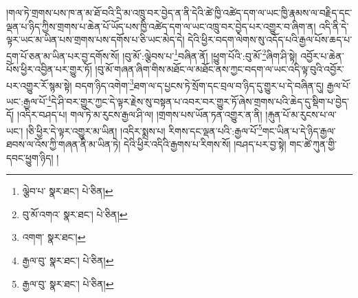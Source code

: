 །གལ་ཏེ་གྲགས་པས་ཁ་ན་མ་ཐོ་བའི་དྲི་མ་འཁྲུ་བར་བྱེད་ན་ནི་དེའི་ཚེ་ཁྱི་འཚེད་དག་ལ་ཡང་ཁྱི་རྣམས་ལ་བརྗིད་དང་ལྡན་པ་ཉིད་ཀྱིས་གྲགས་པ་ཆེན་པོ་ཡོད་པས་ཁྱི་འཚེད་དག་ལ་ཡང་འཁྲུ་བར་བྱེད་པར་འགྱུར་བ་ཞིག་ན། འདི་ནི་དེ་ལྟར་ཡང་མ་ཡིན་པས་གྲགས་པས་དགོས་པ་ཅི་ཡང་མེད་དེ། དེའི་ཕྱིར་བདག་ལེགས་སུ་འདོད་པའི་རྒྱལ་པོས་ཆད་པ་དྲག་པོ་ཅན་མ་ཡིན་པར་བྱ་དགོས་སོ། །བུ་མོ་:ལྕེབས་པ་\footnote{ལྕེབ་པ་  སྣར་ཐང་།  པེ་ཅིན། }བཞིན་ནོ། །ཕྱུག་པོའི་:བུ་མོ་\footnote{བུ་མོ་འགའ་  སྣར་ཐང་།  པེ་ཅིན། }ཞིག་ཤི་སྟེ། འབྱོར་པ་ཆེན་པོས་ཕྱིར་འབྱིན་པར་གྱུར་ཏོ། །བུ་མོ་གཞན་ཞིག་གིས་མཐོང་ལ་མཐོང་ནས་ཀྱང་བདག་ལ་ཡང་འདི་ལྟ་བུའི་འབྱོར་པར་འགྱུར་རོ་སྙམ་སྟེ། བདག་ཉིད་འགེག་\footnote{འགག་  སྣར་ཐང་། }ཐག་ལ་ད་པྱངས་ཏེ་སྲོག་དང་བྲལ་བ་ཉིད་དུ་གྱུར་པ་དེ་བཞིན་དུ། རྒྱལ་པོ་ཡང་:རྒྱལ་པོ་\footnote{རྒྱལ་བུ་  སྣར་ཐང་།  པེ་ཅིན། }དེ་ཤི་བར་གྱུར་ཀྱང་དེ་ལྟར་རྗེས་སུ་བསྟན་པ་འབར་བར་གྱུར་ཏོ་ཞེས་གྲགས་པའི་ཆེད་དུ་སྡིག་པ་བྱེད་དོ། །འདིར་བཤད་པ། གལ་ཏེ་མ་རུངས་རྒྱལ་ཤི་ལ། །གྲགས་པས་ཡོན་ཏན་འགྱུར་ན་ནི། །རྐུན་པོ་མ་རུངས་པ་ལ་ཡང་། །ཅི་ཕྱིར་དེ་ལྟར་འགྱུར་མ་ཡིན། །འདིར་སྨྲས་པ། རིགས་དང་ལྡན་པའི་:རྒྱལ་པོ་\footnote{རྒྱལ་བུ་  སྣར་ཐང་།  པེ་ཅིན། }གང་ཡིན་པ་དེ་ཉིད་རྒྱལ་ཐབས་ལ་འོས་ཀྱི་གཞན་ནི་མ་ཡིན་ཏེ། དེའི་ཕྱིར་འདིའི་རྒྱགས་པ་རིགས་སོ། །བཤད་པར་བྱ་སྟེ། གང་ཚེ་ཀུན་གྱི་དབང་ཕྱུག་ཉིད། །
